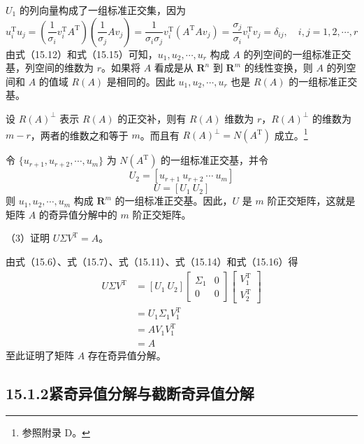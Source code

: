 \documentclass[UTF8, 12pt, fontset=fandol, oneside]{ctexart}
\begin{document}
$U_1$ 的列向量构成了一组标准正交集，因为
\begin{equation}
u_i^{\mathrm{T}}u_j
=\left(\frac{1}{\sigma_i}v_i^{\mathrm{T}}A^{\mathrm{T}}\right)\left(\frac{1}{\sigma_j}Av_j\right)
=\frac{1}{\sigma_i\sigma_j}v_i^{\mathrm{T}}(A^{\mathrm{T}}Av_j)
=\frac{\sigma_j}{\sigma_i}v_i^{\mathrm{T}}v_j
=\delta_{ij},\quad i,j=1,2,\cdots,r
\tag{15.15}
\end{equation}
由式（15.12）和式（15.15）可知，$u_1,u_2,\cdots,u_r$ 构成 $A$ 的列空间的一组标准正交基，列空间的维数为 $r$。如果将 $A$ 看成是从 $\mathbf{R}^n$ 到 $\mathbf{R}^m$ 的线性变换，则 $A$ 的列空间和 $A$ 的值域 $R(A)$ 是相同的。因此 $u_1,u_2,\cdots,u_r$ 也是 $R(A)$ 的一组标准正交基。

设 $R(A)^\perp$ 表示 $R(A)$ 的正交补，则有 $R(A)$ 维数为 $r$，$R(A)^\perp$ 的维数为 $m-r$，两者的维数之和等于 $m$。而且有 $R(A)^\perp=N(A^{\mathrm{T}})$ 成立。\footnote{参照附录 D。}

令 $\{u_{r+1},u_{r+2},\cdots,u_m\}$ 为 $N(A^{\mathrm{T}})$ 的一组标准正交基，并令
\[
U_2=[u_{r+1}\ u_{r+2}\ \cdots\ u_m]
\]
\begin{equation}
U=[U_1\ U_2]
\tag{15.16}
\end{equation}
则 $u_1,u_2,\cdots,u_m$ 构成 $\mathbf{R}^m$ 的一组标准正交基。因此，$U$ 是 $m$ 阶正交矩阵，这就是矩阵 $A$ 的奇异值分解中的 $m$ 阶正交矩阵。

（3）证明 $U\Sigma V^{\mathrm{T}}=A$。

由式（15.6）、式（15.7）、式（15.11）、式（15.14）和式（15.16）得
\begin{equation}
\begin{aligned}
U\Sigma V^{\mathrm{T}}
&=[U_1\ U_2]\begin{bmatrix}\Sigma_1&0\\0&0\end{bmatrix}
\begin{bmatrix}V_1^{\mathrm{T}}\\V_2^{\mathrm{T}}\end{bmatrix}\\
&=U_1\Sigma_1V_1^{\mathrm{T}}\\
&=AV_1V_1^{\mathrm{T}}\\
&=A
\end{aligned}
\tag{15.17}
\end{equation}
至此证明了矩阵 $A$ 存在奇异值分解。

\subsection*{15.1.2\quad 紧奇异值分解与截断奇异值分解}
\end{document}
